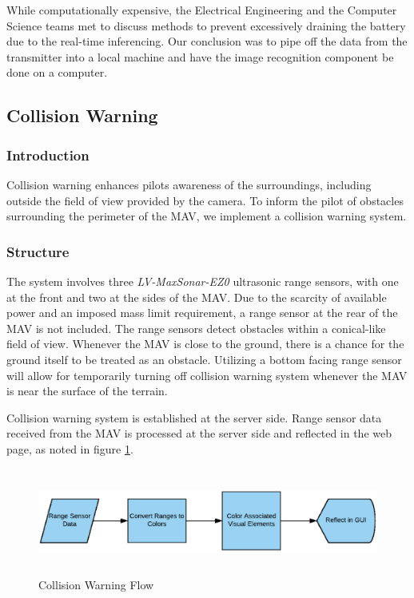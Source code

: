 \documentclass[onecolumn, oneside, letterpaper, draftclsnofoot, 10pt, compsoc]{IEEEtran}
\begin{document}
While computationally expensive, the Electrical Engineering and the Computer Science teams met to discuss methods to prevent excessively draining the battery due to the real-time inferencing. Our conclusion was to pipe off the data from the transmitter into a local machine and have the image recognition component be done on a computer.


\subsection{Collision Warning}
\subsubsection{Introduction}
Collision warning enhances pilot\textquotesingle s awareness of the surroundings, including outside the field of view provided by the camera. To inform the pilot of obstacles surrounding the perimeter of the MAV, we implement a collision warning system.

\subsubsection{Structure}
The system involves three \textit{LV-MaxSonar-EZ0} ultrasonic range sensors, with one at the front and two at the sides of the MAV. Due to the scarcity of available power and an imposed mass limit requirement, a range sensor at the rear of the MAV is not included. The range sensors detect obstacles within a conical-like field of view. Whenever the MAV is close to the ground, there is a chance for the ground itself to be treated as an obstacle. Utilizing a bottom facing range sensor will allow for temporarily turning off collision warning system whenever the MAV is near the surface of the terrain.

Collision warning system is established at the server side. Range sensor data received from the MAV is processed at the server side and reflected in the web page, as noted in figure \ref{fig:ColWar}.
\begin{figure}[h]
    \centering
    \includegraphics[height=3.5cm]{graphics/collision_warning.eps}
    \caption{Collision Warning Flow}
    \label{fig:ColWar}
\end{figure}
\end{document}
